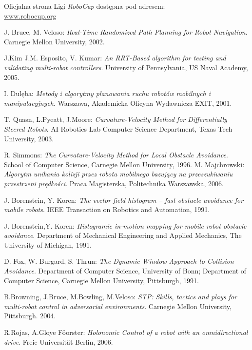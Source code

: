 \begin{thebibliography}{9}
	Oficjalna strona Ligi \textit{RoboCup} dostępna pod adresem:\\
	\url{www.robocup.org}
	
J. Bruce, M. Veloso:
\emph{Real-Time Randomized Path Planning for Robot Navigation}. Carnegie Mellon University, 2002.

J.Kim J.M. Esposito, V. Kumar:
\emph{An RRT-Based algorithm for testing and validating multi-robot controllers}. University of Pennsylvania, US Naval Academy, 2005.

	I. Dulęba:
	\emph{Metody i algorytmy planowania ruchu robotów mobilnych i manipulacyjnych}.
	Warszawa, Akademicka Oficyna Wydawnicza EXIT, 2001.

	T. Quasn, L.Pyeatt, J.Moore:
	\emph{Curvature-Velocity Method for Differentially Steered Robots}.
	AI Robotics Lab
	Computer Science Department,
	Texas Tech University, 2003.

	R. Simmons:
	\emph{The Curvature-Velocity Method for Local Obstacle Avoidance}.
	School of Computer Science,
	Carnegie Mellon University, 1996.
	M. Majchrowski:
	\emph{Algorytm unikania kolizji przez robota mobilnego bazujący na przeszukiwaniu
	przestrzeni prędkości}.
	Praca Magisterska, Politechnika Warszawska, 2006.

	J. Borenstein, Y. Koren:
	\emph{ The vector field histogram -- fast obstacle avoidance for mobile robots}.
	IEEE Transaction on Robotics and Automation, 1991.

	J. Borenstein,Y. Koren:
	\emph{Histogramic in-motion mapping
	for mobile robot obstacle avoidance}.
	Department of Mechanical Engineering and Applied Mechanics,
	The University of Michigan, 1991.

	D. Fox, W. Burgard, S. Thrun:
	\emph{The Dynamic Window Approach to Collision Avoidance}.
	Department of Computer Science, University of Bonn;
	Department of Computer Science, Carnegie Mellon University, Pittsburgh, 1991.
		
	B.Browning, J.Bruce, M.Bowling, M.Veloso:
	\emph{STP: Skills, tactics and plays for multi-robot control
             in adversarial environments}.
	  Carnegie Mellon University, Pittsburgh. 2004.

	R.Rojas, A.Gloye F\"{o}orster:
	\emph{ Holonomic Control of a robot with an omnidirectional
	      drive}.
	  Freie Universität Berlin, 2006.


\end{thebibliography}
